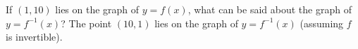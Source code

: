 {If $(1,10)$ lies on the graph of $y=f(x)$, what can be said about the graph of $y=f^{-1}(x)$?}
{The point $(10,1)$ lies on the graph of $y=f^{-1}(x)$ (assuming $f$ is invertible).
}
